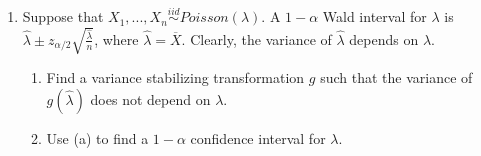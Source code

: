 \documentclass[11pt]{article}
\begin{document}
\begin{enumerate}
\item Suppose that $X_1,...,X_n \overset{iid}{\sim} Poisson(\lambda)$. A $1 - \alpha$ Wald interval for $\lambda$ is $\widehat{\lambda} \pm z_{\alpha/2} \sqrt{\frac{\widehat{\lambda}}{n}}$, where $\widehat{\lambda} = \overline{X}$. Clearly, the variance of $\widehat{\lambda}$ depends on $\lambda$. 

\begin{enumerate}
\item Find a variance stabilizing transformation $g$ such that the variance of $g(\widehat{\lambda})$ does not depend on $\lambda$.

\item Use (a) to find a $1 - \alpha$ confidence interval for $\lambda$.
\end{enumerate}
\end{enumerate}
\end{document}
